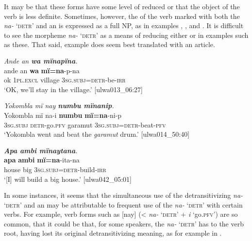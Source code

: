 It may be that these forms have some level of reduced  or that the object of the  verb is less definite. Sometimes, however, the  of the verb marked with both the  \textit{na-} ‘\textsc{detr}’ and an  is expressed as a full NP, as in examples , , and . It is difficult to see the morpheme \textit{na-} ‘\textsc{detr}’ as a means of reducing either  or  in examples such as these. That said, example  does seem best translated with an  article.

\ea%
    \label{ex:syntax:333}
          \textit{Ande an \textbf{wa mïnapïna}.}\\
\gll ande  an      \textbf{wa}    \textbf{mï=na}-p-na\\
    ok    \textsc{1pl.excl}  village  3\textsc{sg.subj}=\textsc{detr}{}-be-\textsc{irr}\\
\glt `OK, we’ll stay in the village.’ [ulwa013\_06:27]
\z


\ea%
    \label{ex:syntax:334}
\textit{Yokombla mï nay \textbf{numbu mïnanip}.}\\
\gll Yokombla  mï      na-i      \textbf{numbu}     \textbf{mï=na}-ni-p\\
    [name]    3\textsc{sg.subj}  \textsc{detr}{}-go.\textsc{pfv}  garamut 3\textsc{sg.subj}=\textsc{detr}-beat-\textsc{pfv}\\
\glt `Yokombla went and beat the \textit{garamut} drum.’ [ulwa014\_50:40]
\z

\ea%
    \label{ex:syntax:335}
          \textit{\textbf{Apa ambi mïnaytana}.}\\
\gll \textbf{apa}  \textbf{ambi}  \textbf{mï=na}-ita-na\\
    house  big    3\textsc{sg.subj}=\textsc{detr}{}-build-\textsc{irr}\\
\glt `[I] will build a big house.’ [ulwa042\_05:01]
\z

In some instances, it seems that the simultaneous use of the detransitivizing  \textit{na-} ‘\textsc{detr}’ and an  may be attributable to frequent use of the  \textit{na-} ‘\textsc{detr}’ with certain verbs. For example, verb forms such as [nay] (< \textit{na-} ‘\textsc{detr’} + \textit{i} ‘go.\textsc{pfv’}) are so common, that it could be that, for some speakers, the  \textit{na-} ‘\textsc{detr}’ has  to the verb root, having lost its original detransitivizing meaning, as for example in .

